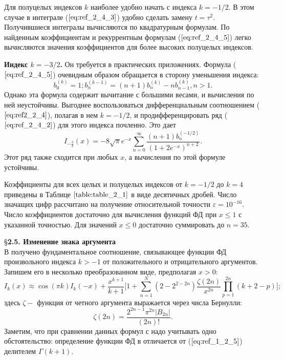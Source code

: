 Для полуцелых индексов $k$ наиболее удобно начать с индекса \linebreak $k = -1/2$. В
этом случае в интеграле ($\ref{eq:ref_2_4_3}$) удобно сделать замену $t = \tau^2$. Получившиеся
интегралы вычисляются по квадратурным формулам. По найденным
коэффициентам и рекуррентным формулам ($\ref{eq:ref_2_4_5}$) легко вычисляются значения
коэффициентов для более высоких полуцелых индексов.

\textbf{Индекс $k = -3/2$.} Он требуется в практических приложениях. Формула
($\ref{eq:ref_2_4_5}$) очевидным образом обращается в сторону уменьшения индекса:
\begin{equation}
b_0^{(k)}=1;b_n^(k-1)=(n+1)b_n^{(k)}-nb_{n-1}^{(k)}, n > 1.
\label{eq:ref_2_4_11}
\end{equation}
Однако эта формула содержит вычитание с большими весами, и вычисления по
ней неустойчивы. Выгоднее воспользоваться дифференциальным
соотношением ($\ref{eq:ref2_2_4}$), полагая в нем $k = -1/2$, и продифференцировать ряд ($\ref{eq:ref_2_4_2}$) для
этого индекса почленно. Это дает
\begin{equation}
I_{-\frac{3}{2}}(x)=-8\sqrt{\pi}e^{-x}\sum\limits_{n=0}^{\infty} \frac{(n+1)b_n^{(-1/2)}}{(1+2e^{-x})^{n+2}}.
\label{eq:ref_2_4_12}
\end{equation}
Этот ряд также сходится при любых $x$, а вычисления по этой формуле
устойчивы.

Коэффициенты для всех целых и полуцелых индексов от $k = -1/2$ до $k = 4$
приведены в Таблице $\ref{table:table_2_1}$ в виде десятичных дробей. Число значащих цифр
рассчитано на получение относительной точности $\varepsilon = 10^{-16}$. Число
коэффициентов достаточно для вычисления функций ФД при $x \leqslant 1$ с указанной
точностью. Для значений $x \leqslant 0$ достаточно суммировать до $n = 35$.



\S \textbf{2.5. Изменение знака аргумента}
\\

В \cite{Glasser} получено фундаментальное соотношение, связывающее функции ФД
произвольного индекса $k > -1$ от положительного и отрицательного
аргументов. Запишем его в несколько преобразованном виде, предполагая
$x > 0$:
\begin{equation}
I_k(x) \approx \cos(\pi k)I_k(-x)+ \frac{x^{k+1}}{k+1}\Bigg[ 1+\sum\limits_{n=1}^N (2-2^{2-2n}) \frac{\zeta (2n)}{x^{2n}}  \prod\limits_{p=1}^{2n} (k+2-p) \Bigg];
\label{eq:ref_2_5_1}
\end{equation}
здесь $\zeta -$ функция от четного аргумента выражается через числа Бернулли:
\begin{equation}
\zeta(2n)= \frac{2^{2n-1} \pi^{2n} |B_{2n}|}{(2n)!}.
\label{eq:ref_2_5_2}
\end{equation}
Заметим, что при сравнении данных формул с \cite{Glasser} надо учитывать одно
обстоятельство: определение функции ФД в \cite{Glasser} отличается от ($\ref{eq:ref_1_2_5}$) делителем $\Gamma(k + 1)$.

